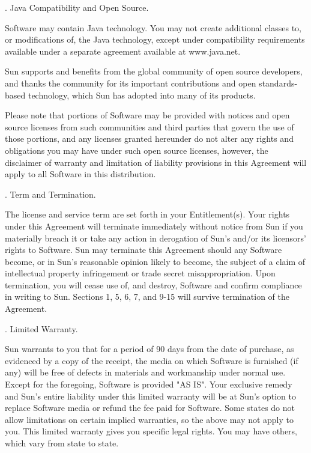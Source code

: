 \bigskip 
\par {}.      Java Compatibility and Open Source.
\bigskip 
\par \noindent Software may contain Java technology. You may not create additional classes to, or modifications of, the Java technology, except under compatibility requirements available under a separate agreement available at www.java.net.
\bigskip 
\par \noindent Sun supports and benefits from the global community of open source developers, and thanks the community for its important contributions and open standards-based technology, which Sun has adopted into many of its products.
\bigskip 
\par \noindent Please note that portions of Software may be provided with notices and open source licenses from such communities and third parties that govern the use of those portions, and any licenses granted hereunder do not alter any rights and obligations you may have under such open source licenses, however, the disclaimer of warranty and limitation of liability provisions in this Agreement will apply to all Software in this distribution.
\bigskip 
\par {}.      Term and Termination. 
\bigskip 
\par \noindent The license and service term are set forth in your Entitlement(s). Your rights under this Agreement will terminate immediately without notice from Sun if you materially breach it or take any action in derogation of Sun's and/or its licensors' rights to Software. Sun may terminate this Agreement should any Software become, or in Sun's reasonable opinion likely to become, the subject of a claim of intellectual property infringement or trade secret misappropriation. Upon termination, you will cease use of, and destroy, Software and confirm compliance in writing to Sun. Sections 1, 5, 6, 7, and 9-15 will survive termination of the Agreement.
\bigskip 
\par {}.      Limited Warranty. 
\bigskip 
\par \noindent Sun warrants to you that for a period of 90 days from the date of purchase, as evidenced by a copy of the receipt, the media on which Software is furnished (if any) will be free of defects in materials and workmanship under normal use. Except for the foregoing, Software is provided "AS IS". Your exclusive remedy and Sun's entire liability under this limited warranty will be at Sun's option to replace Software media or refund the fee paid for Software. Some states do not allow limitations on certain implied warranties, so the above may not apply to you. This limited warranty gives you specific legal rights. You may have others, which vary from state to state.

